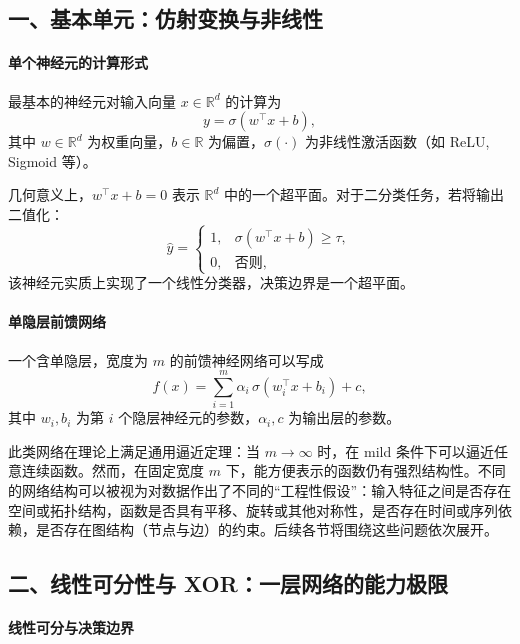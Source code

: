 \subsection*{一、基本单元：仿射变换与非线性}

\paragraph{单个神经元的计算形式}

最基本的神经元对输入向量 $x\in\mathbb{R}^d$ 的计算为
\[
y = \sigma(w^\top x + b),
\]
其中 $w\in\mathbb{R}^d$ 为权重向量，$b\in\mathbb{R}$ 为偏置，$\sigma(\cdot)$ 为非线性激活函数（如 ReLU, Sigmoid 等）。

几何意义上，$w^\top x + b = 0$ 表示 $\mathbb{R}^d$ 中的一个超平面。对于二分类任务，若将输出二值化：
\[
\hat{y} = \begin{cases} 1, & \sigma(w^\top x + b) \ge \tau,\\ 0, & \text{否则}, \end{cases}
\]
该神经元实质上实现了一个线性分类器，决策边界是一个超平面。

\paragraph{单隐层前馈网络}

一个含单隐层，宽度为 $m$ 的前馈神经网络可以写成
\[
f(x) = \sum_{i=1}^m \alpha_i \,\sigma(w_i^\top x + b_i) + c,
\]
其中 $w_i, b_i$ 为第 $i$ 个隐层神经元的参数，$\alpha_i, c$ 为输出层的参数。

此类网络在理论上满足通用逼近定理：当 $m\to\infty$ 时，在 mild 条件下可以逼近任意连续函数。然而，在固定宽度 $m$ 下，能方便表示的函数仍有强烈结构性。不同的网络结构可以被视为对数据作出了不同的“工程性假设”：输入特征之间是否存在空间或拓扑结构，函数是否具有平移、旋转或其他对称性，是否存在时间或序列依赖，是否存在图结构（节点与边）的约束。后续各节将围绕这些问题依次展开。

\subsection*{二、线性可分性与 XOR：一层网络的能力极限}

\paragraph{线性可分与决策边界}


